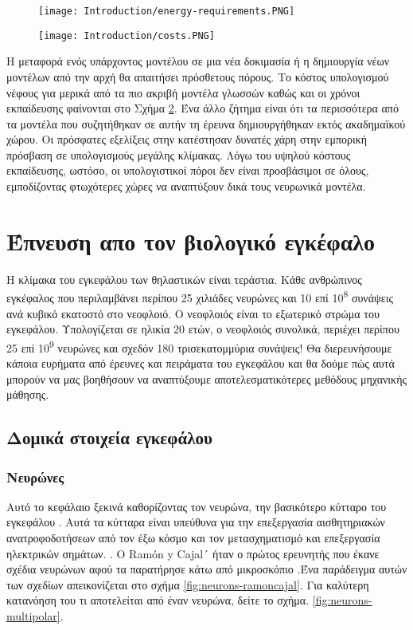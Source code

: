 \documentclass[12pt]{report}
\begin{document}
\begin{figure}[htp]
    \centering
    \texttt{[image: Introduction/energy-requirements.PNG]}
    \caption{}
    \label{fig:energy-requirements}
\end{figure}
\begin{figure}[htp]
    \centering
    \texttt{[image: Introduction/costs.PNG]}
    \caption{}
    \label{fig:costs}
\end{figure}

Η μεταφορά ενός υπάρχοντος μοντέλου σε μια νέα δοκιμασία ή η δημιουργία νέων μοντέλων από την αρχή θα απαιτήσει πρόσθετους πόρους. Το κόστος υπολογισμού νέφους για μερικά από τα πιο ακριβή μοντέλα γλωσσών καθώς και οι χρόνοι εκπαίδευσης φαίνονται στο Σχήμα \ref{fig:costs}. Ένα άλλο ζήτημα είναι ότι τα περισσότερα από τα μοντέλα που συζητήθηκαν σε αυτήν τη έρευνα \cite{Strubell2019} δημιουργήθηκαν εκτός ακαδημαϊκού χώρου. Οι πρόσφατες εξελίξεις στην κατέστησαν δυνατές χάρη στην εμπορική πρόσβαση σε υπολογισμούς μεγάλης κλίμακας. Λόγω του υψηλού κόστους εκπαίδευσης, ωστόσο, οι υπολογιστικοί πόροι δεν είναι προσβάσιμοι σε όλους, εμποδίζοντας φτωχότερες χώρες να αναπτύξουν δικά τους νευρωνικά μοντέλα. 


\chapter{Έπνευση απο τον βιολογικό εγκέφαλο}
Η κλίμακα του εγκεφάλου των θηλαστικών είναι τεράστια. Κάθε ανθρώπινος εγκέφαλος που περιλαμβάνει περίπου 25 χιλιάδες νευρώνες και 10 επί 10\textsuperscript{8} συνάψεις ανά κυβικό εκατοστό \cite{nguyen2013} στο νεοφλοιό. Ο νεοφλοιός είναι το εξωτερικό στρώμα του εγκεφάλου. Υπολογίζεται σε ηλικία 20 ετών, ο νεοφλοιός συνολικά, περιέχει περίπου 25 επί 10\textsuperscript{9} νευρώνες και σχεδόν 180 τρισεκατομμύρια συνάψεις! Θα διερευνήσουμε κάποια ευρήματα από έρευνες και πειράματα του εγκεφάλου και θα δούμε πώς αυτά μπορούν να μας βοηθήσουν να αναπτύξουμε αποτελεσματικότερες  μεθόδους μηχανικής μάθησης.

\section{Δομικά στοιχεία εγκεφάλου}
\subsection{Νευρώνες}
Αυτό το κεφάλαιο ξεκινά καθορίζοντας τον νευρώνα, την βασικότερο κύτταρο του εγκεφάλου \cite{gerstner2014}. Αυτά τα κύτταρα είναι υπεύθυνα για την επεξεργασία αισθητηριακών ανατροφοδοτήσεων από τον έξω κόσμο και τον μετασχηματισμό και επεξεργασία ηλεκτρικών σημάτων. \cite{balduzzi2013}. Ο \textlatin{Ramón y Cajal´} ήταν ο πρώτος ερευνητής που έκανε σχέδια νευρώνων αφού τα παρατήρησε κάτω από μικροσκόπιο \cite{garcialopezp2010}
.Ένα παράδειγμα αυτών των σχεδίων απεικονίζεται στο σχήμα \ref{fig:neurons-ramoncajal}. Για καλύτερη κατανόηση του τι αποτελείται από έναν νευρώνα, δείτε το σχήμα. \ref{fig:neurons-multipolar}.
\end{document}
